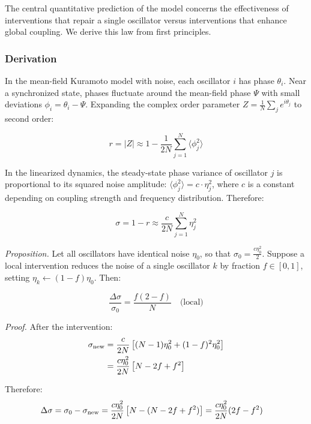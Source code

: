\documentclass[12pt]{article}
\begin{document}
The central quantitative prediction of the model concerns the effectiveness of
interventions that repair a single oscillator versus interventions that enhance
global coupling. We derive this law from first principles.

\subsubsection*{Derivation}

In the mean-field Kuramoto model with noise, each oscillator $i$ has phase
$\theta_i$. Near a synchronized state, phases fluctuate around the mean-field
phase $\Psi$ with small deviations $\phi_i = \theta_i - \Psi$. Expanding the
complex order parameter $Z = \frac{1}{N}\sum_j e^{i\theta_j}$ to second order:

\begin{equation}
r = |Z| \approx 1 - \frac{1}{2N}\sum_{j=1}^{N} \langle \phi_j^2 \rangle
\end{equation}

In the linearized dynamics, the steady-state phase variance of oscillator $j$ is
proportional to its squared noise amplitude:
$\langle \phi_j^2 \rangle = c \cdot \eta_j^2$,
where $c$ is a constant depending on coupling strength and frequency
distribution. Therefore:

\begin{equation}
\sigma = 1 - r \approx \frac{c}{2N} \sum_{j=1}^{N} \eta_j^2
\end{equation}

\textit{Proposition.} Let all oscillators have identical noise $\eta_0$, so that
$\sigma_0 = \frac{c \eta_0^2}{2}$. Suppose a local intervention reduces the noise
of a single oscillator $k$ by fraction $f \in [0,1]$, setting
$\eta_k \leftarrow (1-f)\eta_0$. Then:

\begin{equation}
\boxed{\frac{\Delta\sigma}{\sigma_0} = \frac{f(2-f)}{N}} \quad \text{(local)}
\end{equation}

\textit{Proof.} After the intervention:
\begin{align}
\sigma_\text{new} &= \frac{c}{2N}\left[(N-1)\eta_0^2 + (1-f)^2\eta_0^2\right] \notag\\
&= \frac{c\eta_0^2}{2N}\left[N - 2f + f^2\right]
\end{align}

Therefore:
\begin{align}
\Delta\sigma &= \sigma_0 - \sigma_\text{new}
= \frac{c\eta_0^2}{2N}\left[N - (N - 2f + f^2)\right]
= \frac{c\eta_0^2}{2N}(2f - f^2) \notag
\end{align}
\end{document}

